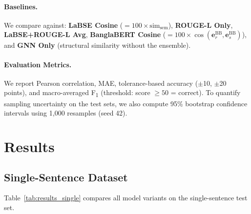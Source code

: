 \documentclass[11pt]{article}
\begin{document}
\paragraph{Baselines.} We compare against: \textbf{LaBSE Cosine} ($=100\times\mathrm{sim}_\mathrm{sem}$), \textbf{ROUGE-L Only}, \textbf{LaBSE+ROUGE-L Avg}, \textbf{BanglaBERT Cosine} ($=100\times\cos(\mathbf{e}^\mathrm{BB}_r,\mathbf{e}^\mathrm{BB}_s)$), and \textbf{GNN Only} (structural similarity without the ensemble).

\paragraph{Evaluation Metrics.} We report Pearson correlation, MAE, tolerance-based accuracy ($\pm$10, $\pm$20 points), and macro-averaged F\textsubscript{1} (threshold: score $\geq 50$ = correct). To quantify sampling uncertainty on the test sets, we also compute 95\% bootstrap confidence intervals using 1{,}000 resamples (seed 42).

\section{Results}

\subsection{Single-Sentence Dataset}

Table~\ref{tab:results_single} compares all model variants on the single-sentence test set.

\begin{table}[t]
  \centering
  \caption{Results on single-sentence dataset (201 test samples). Acc.\ = binary accuracy; $\pm$10\% = tolerance accuracy within 10 points.}
  \label{tab:results_single}
\end{table}
\end{document}
